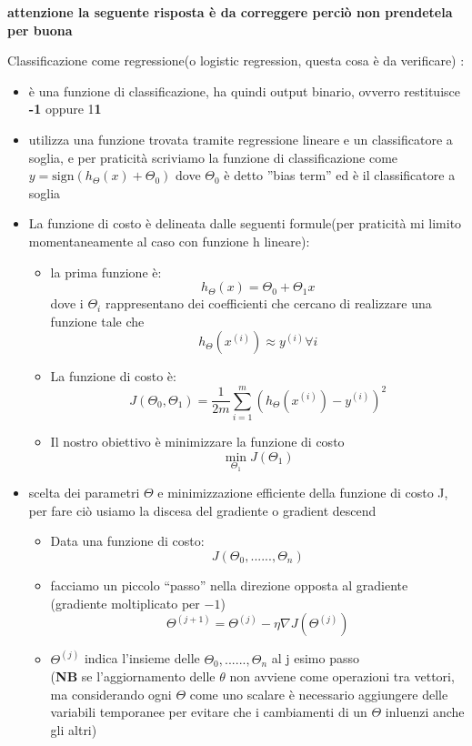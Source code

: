 \documentclass[10pt,oneside,a4paper]{article}
\begin{document}
\textbf{attenzione la seguente risposta è da correggere perciò non prendetela per buona}


Classificazione come regressione(o logistic regression, questa cosa è da verificare) :
\begin{itemize}
\item è una funzione di classificazione, ha quindi output binario, ovverro restituisce \textbf{-1} oppure 1\textbf{1}
\item utilizza una funzione trovata tramite regressione lineare e un classificatore a soglia, e per praticità scriviamo la funzione di classificazione come $y = \mathrm{sign}(h_{\Theta}(x)+\Theta_{0})$ dove $\Theta_{0}$ è detto ''bias term'' ed è il classificatore a soglia
\item La funzione di costo è delineata dalle seguenti formule(per praticità mi limito momentaneamente al caso con funzione h lineare):
 \begin{itemize}
 \item la prima funzione è:
  $$h_{\Theta}(x)=\Theta_{0}+\Theta_{1}x$$
 dove i $\Theta_{i}$ rappresentano dei coefficienti che cercano di realizzare una funzione tale che 
 $$h_{\Theta}(x^{(i)})\approx y^{(i)}  \forall i$$
 
 \item La funzione di costo è:
 $$J(\Theta_{0},\Theta_{1})= \frac{1}{2m} \sum_{i=1}^{m}(h_{\Theta}(x^{(i)})-y^{(i)})^2$$
 \item Il nostro obiettivo è minimizzare la funzione di costo
 $$\min_{\Theta_{1}} J(\Theta_{1})$$
 
 \end{itemize}
 
 \item scelta dei parametri $\Theta$ e minimizzazione efficiente della funzione di costo J,
 per fare ciò usiamo la discesa del gradiente o gradient descend
 \begin{itemize}
\item Data una funzione di costo:
$$J(\Theta_{0},......,\Theta_{n})$$
\item facciamo un piccolo ``passo'' nella direzione opposta al gradiente (gradiente moltiplicato per $-1$)
$$\Theta^{(j+1)} = \Theta^{(j)}-\eta \nabla J(\Theta^{(j)})$$
\item $\Theta^{(j)}$ indica l'insieme delle $\Theta_{0},......,\Theta_{n}$ al j esimo passo \\
(\textbf{NB} se l'aggiornamento delle $\theta $ non avviene come operazioni tra vettori, ma considerando ogni $\Theta$ come uno scalare è necessario aggiungere delle variabili temporanee per evitare che i cambiamenti di un $\Theta$ inluenzi anche gli altri)


\end{itemize}
\end{itemize}
\end{document}
